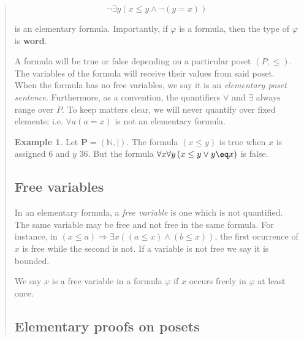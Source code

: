 \documentclass[a4paper, 12pt]{article}
\theoremstyle{definition}
\theoremstyle{definition}
\newtheorem{example}{Example}
\theoremstyle{definition}
\begin{document}
\begin{quote}
\begin{equation*}
    \neg\exists y \left( x \leq y \land \neg(y = x)  \right) 
\end{equation*}

is an elementary formula. Importantly, if $\varphi$ is a formula, then the type
of $\varphi$ is \textbf{word}.

A formula will be true or false depending on a particular poset $(P, \leq) $.
The variables of the formula will receive their values from said poset. When 
the formula has no free variables, we say it is an \textit{elementary poset sentence}.
Furthermore, as a convention, the quantifiers $\forall $ and $\exists $ always 
range over $P$. To keep matters clear, we will never quantify over fixed elements;
i.e. $\forall a(a=x)$ is not an elementary formula. 


\begin{example}
    Let $\textbf{P} = (\mathbb{N}, \mid)$. The formula $(x \leq y)$ is true when 
    $x$ is assigned $6$ and $y$ $36$. But the formula $\forall x \forall y\left( x \leq y \lor y \eq x \right) $ is false.
\end{example}

\subsection{Free variables}

In an elementary formula, a \textit{free variable} is one which is not
quantified. The same variable may be free and not free in the same formula. For
instance, in $(x \leq a) \Rightarrow \exists x \left( (a \leq x) \land (b \leq
x) \right) $, the first ocurrence of $x$ is free while the second is not. If a
variable is not free we say it is bounded.

We say $x$ is a free variable in a formula $\varphi$ if $x$ occurs freely in
$\varphi$ at least once.

\subsection{Elementary proofs on posets}


\end{quote}
\end{document}

